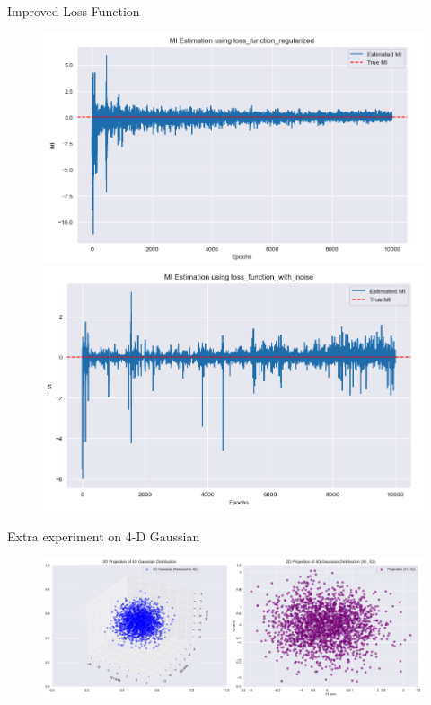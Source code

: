\documentclass[final]{beamer}
\newlength{\colwidth}
\begin{document}
\begin{frame}[t]
\begin{columns}[t]
\begin{column}{\colwidth}
\begin{block}{Improved Loss Function}
    \begin{figure}
    \centering
    \begin{minipage}{0.49\textwidth}
    \centering
    \includegraphics[width=1.05\linewidth]{MI_img/截屏2024-12-31 13.20.27.png}
    \end{minipage}
    \begin{minipage}{0.49\textwidth}
    \centering
    \centering
    \includegraphics[width=1\linewidth]{MI_img/截屏2024-12-31 13.20.49.png}
    \end{minipage}
    \end{figure}

  \end{block}


  \begin{block}{Extra experiment on 4-D Gaussian}
    \begin{figure}
        \centering
        \includegraphics[width=1\linewidth]{截屏2024-12-31 13.43.13.png}
    \end{figure}


\end{block}
\end{column}
\end{columns}
\end{frame}
\end{document}

